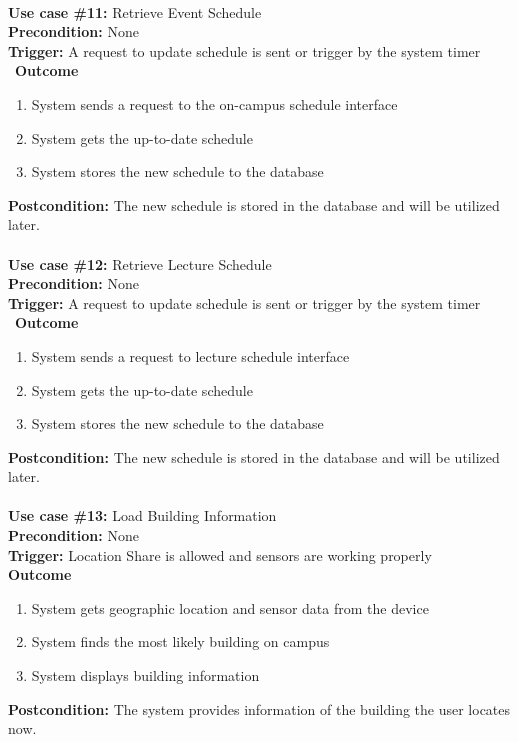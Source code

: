 \documentclass[12pt]{article}
\begin{document}
\noindent\\
\textbf{Use case \#11:} Retrieve Event Schedule\\
\textbf{Precondition:} None\\
\textbf{Trigger:} A request to update schedule is sent or trigger by the system timer\\\
\textbf{Outcome}
\begin{enumerate}
	\item System sends a request to the on-campus schedule interface
    \item System gets the up-to-date schedule
    \item System stores the new schedule to the database
\end{enumerate}
\textbf{Postcondition:} The new schedule is stored in the database and will be utilized later.\\


\noindent\\
\textbf{Use case \#12:} Retrieve Lecture Schedule\\
\textbf{Precondition:} None\\
\textbf{Trigger:} A request to update schedule is sent or trigger by the system timer\\\
\textbf{Outcome}
\begin{enumerate}
	\item System sends a request to lecture schedule interface
    \item System gets the up-to-date schedule
    \item System stores the new schedule to the database
\end{enumerate}
\textbf{Postcondition:} The new schedule is stored in the database and will be utilized later.\\


\noindent\\
\textbf{Use case \#13:} Load Building Information\\
\textbf{Precondition:} None\\
\textbf{Trigger:} Location Share is allowed and sensors are working properly\\
\textbf{Outcome}
\begin{enumerate}
	\item System gets geographic location and sensor data from the device
    \item System finds the most likely building on campus
    \item System displays building information
\end{enumerate}
\textbf{Postcondition:} The system provides information of the building the user locates now.\\
\end{document}

